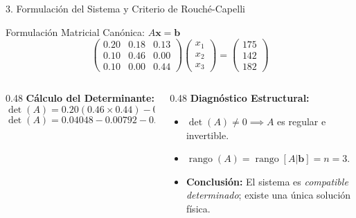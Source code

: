 \documentclass[
  spanish,
  aspectratio=169,
  xcolor={dvipsnames,table}
]{beamer}
\begin{document}
\begin{frame}{3. Formulación del Sistema y Criterio de Rouché-Capelli}
  \begin{block}{Formulación Matricial Canónica: $A\mathbf{x} = \mathbf{b}$}
    $$\begin{pmatrix}
        0.20 & 0.18 & 0.13 \\
        0.10 & 0.46 & 0.00 \\
        0.10 & 0.00 & 0.44
      \end{pmatrix}
      \begin{pmatrix} x_1 \\ x_2 \\ x_3 \end{pmatrix}
      =
      \begin{pmatrix} 175 \\ 142 \\ 182 \end{pmatrix}$$
  \end{block}
  \vspace{0.15cm}
  \begin{columns}[T]
    \begin{column}{0.48\textwidth}
      \textbf{\color{uanlblue}Cálculo del Determinante:}
      $$\det(A) = 0.20(0.46 \times 0.44) - 0.18(0.10 \times 0.44) + 0.13(-0.046)$$
      $$\det(A) = 0.04048 - 0.00792 - 0.00598 = \mathbf{0.02658} \neq 0$$
    \end{column}
    \begin{column}{0.48\textwidth}
      \textbf{\color{uanlblue}Diagnóstico Estructural:}
      \begin{itemize}
        \item $\det(A) \neq 0 \implies A$ es regular e invertible.
        \item $\operatorname{rango}(A) = \operatorname{rango}[A|\mathbf{b}] = n = 3$.
        \item \textbf{Conclusión:} El sistema es \textit{compatible determinado}; existe una única solución física.
      \end{itemize}
    \end{column}
  \end{columns}
\end{frame}
\end{document}
